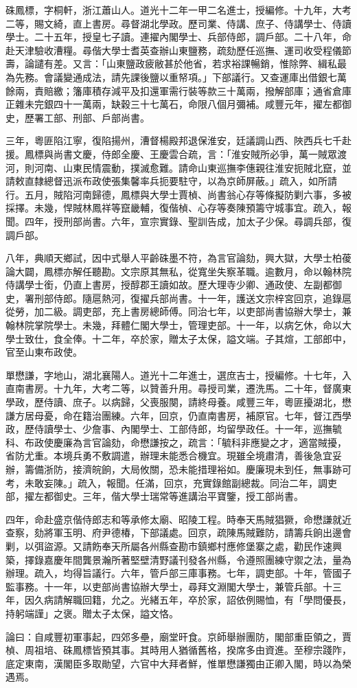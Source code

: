 \begin{pinyinscope}
硃鳳標，字桐軒，浙江蕭山人。道光十二年一甲二名進士，授編修。十九年，大考二等，賜文綺，直上書房。尋督湖北學政。歷司業、侍講、庶子、侍講學士、侍讀學士。二十五年，授皇七子讀。連擢內閣學士、兵部侍郎，調戶部。二十八年，命赴天津驗收漕糧。尋偕大學士耆英查辦山東鹽務，疏劾歷任巡撫、運司收受程儀節壽，論譴有差。又言：「山東鹽政疲敝甚於他省，若求裕課暢銷，惟除弊、緝私最為先務。會議變通成法，請先課後鹽以重帑項。」下部議行。又查運庫出借銀七萬餘兩，責賠繳；籓庫積存減平及扣還軍需行裝等款三十萬兩，撥解部庫；通省倉庫正雜未完銀四十一萬兩，缺穀三十七萬石，命限八個月彌補。咸豐元年，擢左都御史，歷署工部、刑部、戶部尚書。

三年，粵匪陷江寧，復陷揚州，漕督楊殿邦退保淮安，廷議調山西、陜西兵七千赴援。鳳標與尚書文慶，侍郎全慶、王慶雲合疏，言：「淮安賊所必爭，萬一賊眾渡河，則河南、山東民情震動，撲滅愈難。請命山東巡撫李僡親往淮安扼賊北竄，並請敕直隸總督迅派布政使張集馨率兵扼要駐守，以為京師屏蔽。」疏入，如所請行。五月，賊陷河南歸德，鳳標與大學士賈楨、尚書翁心存等條擬防剿六事，多被採擇。未幾，悍賊林鳳祥等竄畿輔，復偕楨、心存等奏陳預籌守城事宜。疏入，報聞。四年，授刑部尚書。六年，宣宗實錄、聖訓告成，加太子少保。尋調兵部，復調戶部。

八年，典順天鄉試，因中式舉人平齡硃墨不符，為言官論劾，興大獄，大學士柏葰論大闢，鳳標亦解任聽勘。文宗原其無私，從寬坐失察革職。逾數月，命以翰林院侍講學士銜，仍直上書房，授醇郡王讀如故。歷大理寺少卿、通政使、左副都御史，署刑部侍郎。隨扈熱河，復擢兵部尚書。十一年，護送文宗梓宮回京，追錄扈從勞，加二級。調吏部，充上書房總師傅。同治七年，以吏部尚書協辦大學士，兼翰林院掌院學士。未幾，拜體仁閣大學士，管理吏部。十一年，以病乞休，命以大學士致仕，食全俸。十二年，卒於家，贈太子太保，謚文端。子其煊，工部郎中，官至山東布政使。

單懋謙，字地山，湖北襄陽人。道光十二年進士，選庶吉士，授編修。十七年，入直南書房。十九年，大考二等，以贊善升用。尋授司業，遷洗馬。二十年，督廣東學政，歷侍讀、庶子。以病歸，父喪服闋，請終母養。咸豐三年，粵匪擾湖北，懋謙方居母憂，命在籍治團練。六年，回京，仍直南書房，補原官。七年，督江西學政，歷侍讀學士、少詹事、內閣學士、工部侍郎，均留學政任。十一年，巡撫毓科、布政使慶廉為言官論劾，命懋謙按之，疏言：「毓科非應變之才，適當賊擾，省防尤重。本境兵勇不敷調遣，辦理未能悉合機宜。現雖全境肅清，善後急宜妥辦，籌備浙防，接濟皖餉，大局攸關，恐未能措理裕如。慶廉現未到任，無事跡可考，未敢妄陳。」疏入，報聞。任滿，回京，充實錄館副總裁。同治二年，調吏部，擢左都御史。三年，偕大學士瑞常等進講治平寶鑒，授工部尚書。

四年，命赴盛京偕侍郎志和等承修太廟、昭陵工程。時奉天馬賊猖獗，命懋謙就近查察，劾將軍玉明、府尹德椿，下部議處。回京，疏陳馬賊難防，請籌兵餉出邊會剿，以弭盜源。又請飭奉天所屬各州縣查勘市鎮鄉村應修堡寨之處，勸民作速興築，擇錄嘉慶年間龔景瀚所著堅壁清野議刊發各州縣，令遵照團練守禦之法，量為辦理。疏入，均得旨議行。六年，管戶部三庫事務。七年，調吏部。十年，管國子監事務。十一年，以吏部尚書協辦大學士，尋拜文淵閣大學士，兼管兵部。十三年，因久病請解職回籍，允之。光緒五年，卒於家，詔依例賜恤，有「學問優長，持躬端謹」之褒。贈太子太保，謚文恪。

論曰：自咸豐初軍事起，四郊多壘，廟堂旰食。京師舉辦團防，閣部重臣領之，賈楨、周祖培、硃鳳標皆預其事。其時用人猶循舊格，揆席多由資進。至穆宗踐阼，底定東南，漢閣臣多取勛望，六官中大拜者鮮，惟單懋謙獨由正卿入閣，時以為榮遇焉。


\end{pinyinscope}